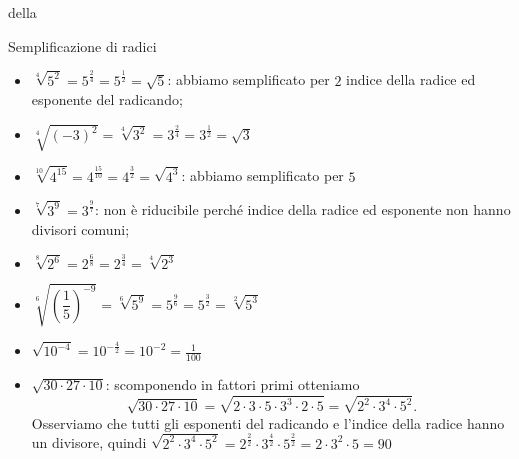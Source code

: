 della 
% 

 \begin{esempio}
Semplificazione di radici
\begin{itemize}
 \item \(\sqrt[4]{5^2}=5^{\frac{2}{4}}=5^{\frac{1}{2}}=\sqrt 5\): 
  abbiamo semplificato per \(2\) indice della radice ed esponente del 
radicando;
 \item 
\(\sqrt[4]{(-3)^2}=\sqrt[4]{3^2}=3^{\frac{2}{4}}=
 3^{\frac{1}{2}}=\sqrt 3\)
 \item \(\sqrt[10]{4^{15}}=4^{\frac{15}{10}}=4^{\frac{3}{2}}=\sqrt{4^3}\): 
  abbiamo semplificato per \(5\)
 \item \(\sqrt[7]{3^9}=3^{\frac{9}{7}}\): 
  non è riducibile perché indice della radice ed esponente non hanno 
divisori comuni;
 \item \(\sqrt[8]{2^6}=2^{\frac{6}{8}}=2^{\frac{3}{4}}=\sqrt[4]{2^3}\)
 \item \(\sqrt[6]{\left(\dfrac{1}{5}\right)^{-9}}=\sqrt[6]{5^9}=
        5^{\frac{9}{6}}=5^{\frac{3}{2}}=\sqrt[2]{5^3}\)
 \item \(\sqrt{10^{-4}}=10^{-\frac{4}{2}}=10^{-2}=\frac 1{100}\)
 \item \(\sqrt{30\cdot 27\cdot 10}\): scomponendo in fattori primi otteniamo 
  \[\sqrt{30\cdot 27\cdot 10}=
    \sqrt{2\cdot 3\cdot 5\cdot 3^3\cdot 2\cdot 5}=
    \sqrt{2^2\cdot 3^4\cdot 5^2}.\] 
    Osserviamo che tutti gli esponenti del radicando e l'indice della 
radice hanno un divisore, quindi 
    \(\sqrt{2^2\cdot 3^4\cdot 5^2}=
     2^{\frac{2}{2}} \cdot 3^{\frac{4}{2}} \cdot 5^{\frac{2}{2}}=
     2\cdot 3^2\cdot 5=90\)
\end{itemize}
\end{esempio}

